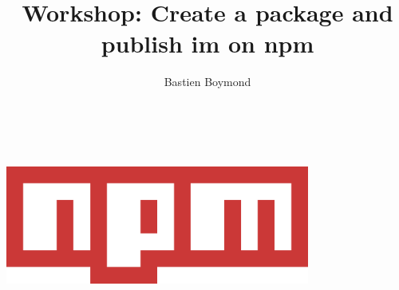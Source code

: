 \documentclass{article}
\title{Workshop: Create a package and publish im on npm}
\author{Bastien Boymond}
\date{}
\begin{document}
    \maketitle
    \begin{center}
        \includegraphics[width=10cm, height=6cm]{npm.png}
    \end{center}
    \newpage
\end{document}
